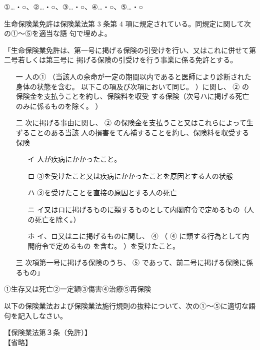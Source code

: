 \documentclass[report,gutter=10mm,fore-edge=10mm,uplatex,dvipdfmx]{jlreq}
\begin{document}
①…・○、②…・○、③…・○、④…・○、⑤…・○

生命保険業免許は保険業法第 3 条第 4 項に規定されている。同規定に関して次の①～⑤を適当な語
句で埋めよ。

「生命保険業免許は、第一号に掲げる保険の引受けを行い、又はこれに併せて第二号若しくは第三号に
掲げる保険の引受けを行う事業に係る免許とする。

\begin{itemize}
 \item [一]  人の①
（当該人の余命が一定の期間以内であると医師により診断された身体の状態を含む。
以下この項及び次項において同じ。
）に関し、 ②
の保険金を支払うことを約し、保険料を収受
する保険（次号ハに掲げる死亡のみに係るものを除く。
）
 \item [二] 次に掲げる事由に関し、 ②
の保険金を支払うこと又はこれらによって生ずることのある当該
人の損害をてん補することを約し、保険料を収受する保険
\begin{itemize}
 \item [イ]
 人が疾病にかかったこと。
 \item [ロ]
③を受けたこと又は疾病にかかったことを原因とする人の状態
 \item [ハ]
③を受けたことを直接の原因とする人の死亡
 \item [ニ]
 イ又はロに掲げるものに類するものとして内閣府令で定めるもの（人の死亡を除く。）
 \item [ホ]
 イ、ロ又はニに掲げるものに関し、 ④ （
④
に類する行為として内閣府令で定めるもの
を含む。
）を受けたこと。
\end{itemize}
 \item [三]
 次項第一号に掲げる保険のうち、
⑤
であって、前二号に掲げる保険に係るもの」
\end{itemize}

①生存又は死亡②一定額③傷害④治療⑤再保険

以下の保険業法および保険業法施行規則の抜粋について、次の①～⑤に適切な語句を記入しなさい。

【保険業法第３条（免許）】\\
【省略】\\
\end{document}
